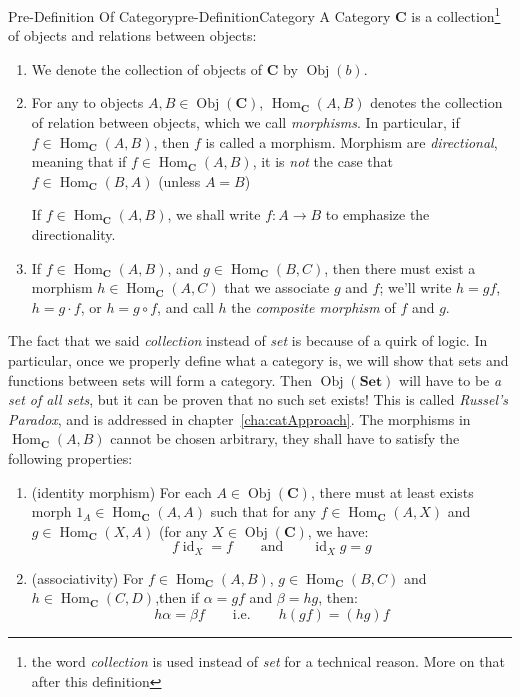 \documentclass{book}
\newcommand{\id}{{\operatorname{id}}}
\newcommand{\Hom}{{\operatorname{Hom}}}
\newcommand{\Obj}{{\operatorname{Obj}}}
\renewcommand{\bf}[1]{\textbf{#1}}
\begin{document}
\begin{defn}{Pre-Definition Of Category}{pre-DefinitionCategory}
	A Category \textbf{C} is a collection\footnote{the word \emph{collection} is used instead of \emph{set} for a technical
	reason. More on that after this definition} of objects and relations between objects:
	\begin{enumerate}
		\item We denote the collection of objects of \textbf{C} by $\operatorname{Obj}(b)$.
		\item For any to objects $A,B \in \operatorname{Obj}(\bf{C})$, $\Hom_{\bf{C}}(A,B)$ denotes the collection of
			relation between objects, which we call \emph{morphisms}. In particular, if $f \in \Hom_{\bf{C}}(A,B)$,
			then $f$ is called a morphism. Morphism are \emph{directional}, meaning that if $f \in
			\Hom_{\bf{C}}(A,B)$, it is \emph{not} the case that $f \in \Hom_{\bf{C}}(B,A)$ (unless $A = B$)

			If $f \in \Hom_{\bf{C}}(A,B)$, we shall write $f: A \to B$ to emphasize the directionality.
		\item If $f \in \Hom_{\bf{C}}(A,B)$, and $g \in \Hom_{\bf{C}}(B,C)$, then there must exist a morphism $h
			\in\Hom_{\bf{C}}(A,C)$
			that we associate $g$ and $f$; we'll write $h = gf$, $h = g\cdot f$, or $h = g\circ f$, and call
			$h$ the \emph{composite morphism} of $f$ and $g$.
	\end{enumerate}
\end{defn}

The fact that we said \emph{collection} instead of \emph{set} is because of a quirk of logic. In particular,
once we properly define what a category is, we will show that sets and functions between sets will form a
category. Then $\operatorname{Obj}(\textbf{Set})$ will have to be \emph{a set of all sets}, but it can be
proven that no such set exists! This is called \emph{Russel's Paradox}, and is addressed in
chapter~\ref{cha:catApproach}. The morphisms in $\Hom_{\bf{C}}(A,B)$ cannot be chosen arbitrary, they shall have to satisfy
the following properties:
\begin{enumerate}
	\item (identity morphism) For each $A \in \Obj(\bf{C})$, there must at least exists morph $1_A \in
		\Hom_{\bf{C}}(A,A)$ such that for any
		$f \in \Hom_{\bf{C}}(A,X)$ and $g \in \Hom_{\bf{C}}(X,A)$ (for any $X \in \Obj(\bf{C})$, we have:
		\[
			f\id_X = f \qquad \text{and} \qquad \id_X g =g
		\]
	\item (associativity) For $f \in \Hom_{\bf{C}}(A,B)$, $g \in \Hom_{\bf{C}}(B,C)$ and $h \in \Hom_{\bf{C}}(C,D)$,then if $\alpha = gf$ and
		$\beta = hg$, then:
		\[
			h\alpha = \beta f \qquad \text{i.e.} \qquad h(gf) = (hg)f
		\]
\end{enumerate}
\end{document}
